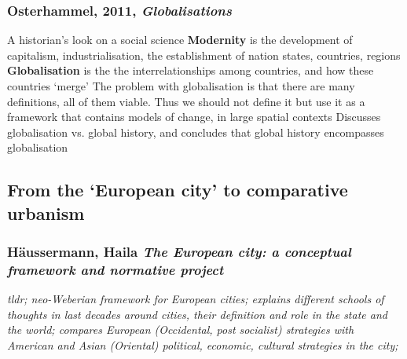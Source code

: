 \documentclass{article}
\begin{document}
\subsubsection{Osterhammel, 2011, \textit{Globalisations}}

\begin{outline}
	\1 A historian's look on a social science
	\1 \textbf{Modernity} is the development of capitalism, industrialisation, the establishment of nation states, countries, regions
	\1 \textbf{Globalisation} is the the interrelationships among countries, and how these countries `merge'
	\1 The problem with globalisation is that there are many definitions, all of them viable. Thus we should not define it but use it as a framework that contains models of change, in large spatial contexts
	\1 Discusses globalisation vs. global history, and concludes that global history encompasses globalisation
\end{outline}

\subsection{From the `European city' to comparative urbanism}

\subsubsection{Häussermann, Haila \textit{The European city: a conceptual framework and normative project}}

\textit{tldr; neo-Weberian framework for European cities; explains different schools of thoughts in last decades around cities, their definition and role in the state and the world; compares European (Occidental, post socialist) strategies with American and Asian (Oriental) political, economic, cultural strategies in the city;}
\end{document}

